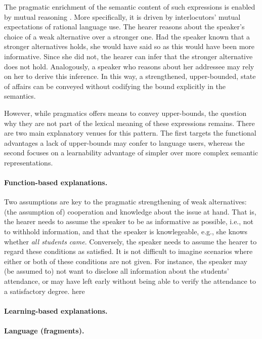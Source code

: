 \documentclass[a4paper]{article}
\newcommand{\hl}[1]{\textcolor[rgb]{.8,.33,.0}{#1}}%
\begin{document}
The pragmatic enrichment of the semantic content of such expressions is enabled by mutual reasoning \citep{grice:1975}. More specifically, it is driven by interlocutors' mutual expectations of rational language use. The hearer reasons about the speaker's choice of a weak alternative over a stronger one. Had the speaker known that a stronger alternatives holds, she would have said so as this would have been more informative. Since she did not, the hearer can infer that the stronger alternative does not hold. Analogously, a speaker who reasons about her addressee may rely on her to derive this inference. In this way, a strengthened, upper-bounded, state of affairs can be conveyed without codifying the bound explicitly in the semantics.

However, while pragmatics offers means to convey upper-bounds, the question why they are not part of the lexical meaning of these expressions remains. There are two main explanatory venues for this pattern. The first targets the functional advantages a lack of upper-bounds may confer to language users, whereas the second focuses on a learnability advantage of simpler over more complex semantic representations. 

\paragraph{Function-based explanations.} Two assumptions are key to the pragmatic strengthening of weak alternatives: (the assumption of) cooperation and knowledge about the issue at hand. That is, the hearer needs to assume the speaker to be as informative as possible, i.e., not to withhold information, and that the speaker is knowlegeable, e.g., she knows whether {\em all students came}. Conversely, the speaker needs to assume the hearer to regard these conditions as satisfied. It is not difficult to imagine scenarios where either or both of these conditions are not given. For instance, the speaker may (be assumed to) not want to disclose all information about the students' attendance, or may have left early without being able to verify the attendance to a satisfactory degree. \hl{here}

\paragraph{Learning-based explanations.}


\paragraph{Language (fragments).}
\end{document}
